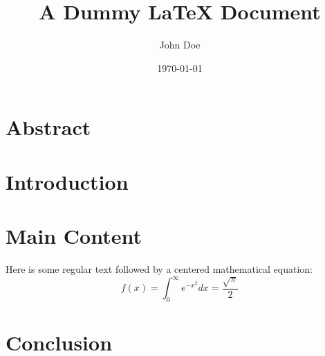 \documentclass[12pt]{article}
\title{A Dummy LaTeX Document}
\author{John Doe}
\date{\today}
\begin{document}
\maketitle

\section*{Abstract}
\noindent
\lipsum[1] %

\section{Introduction}
\noindent
\lipsum[2]

\section{Main Content}
\noindent
Here is some regular text followed by a centered mathematical equation:
\begin{equation}
    f(x) = \int_{0}^{\infty} e^{-x^2} dx = \frac{\sqrt{\pi}}{2}
\end{equation}

\noindent
\lipsum[3]

\section{Conclusion}
\noindent
\lipsum[4]
\end{document}

